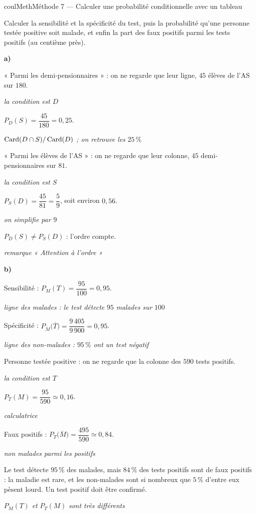 \documentclass[11pt,a4paper]{article}
\makeatletter
\renewcommand{\approx}{\simeq}
\newcounter{lycee@signet}
\newcommand{\signet}[3][]{\stepcounter{lycee@signet}%
  \edef\lycee@dest{\if\relax\detokenize{#1}\relax
    signet.\arabic{lycee@signet}\else#1\fi}%
  \hypertarget{\lycee@dest}{}\bookmark[level=#2,dest=\lycee@dest]{#3}}
\newcommand{\res}[1]{#1}
\newcounter{methode}
\newenvironment{methodebox}[1][Méthode]{\stepcounter{methode}%
  \begin{boitecours}[phantom={\signet[methode-\arabic{methode}]{2}{#1}}]{coulMeth}{#1}}%
  {\end{boitecours}}
\newcommand{\explique}[2]{\par\smallskip\noindent
  \begin{minipage}[t]{0.57\linewidth}\raggedright #1\end{minipage}\hfill
  \begin{minipage}[t]{0.40\linewidth}\raggedright\leavevmode
    {\small\itshape\color{black!60}#2}\end{minipage}\par}
\newcommand{\cas}[1]{\par\smallskip\noindent\textbf{\color{coulExo}#1}\vadjust{\nobreak}}
\newenvironment{correction}{\par}{\par}
\makeatother
\begin{document}
\begin{methodebox}[Méthode 7 --- Calculer une probabilité conditionnelle avec un tableau]
\begin{questions}[label=\alph*)]
    Calculer la sensibilité et la spécificité du test, puis la probabilité qu'une
    personne testée positive soit malade, et enfin la part des faux positifs parmi
    les tests positifs (au centième près).
\end{questions}
\begin{correction}
\cas{a)}
\explique{« Parmi les demi-pensionnaires » : on ne regarde que leur ligne, $45$ élèves
de l'AS sur $180$.}{la condition est $D$}
\explique{$P_D(S)=\dfrac{45}{180}=\res{0{,}25}$.}{$\operatorname{Card}(D\cap S)/\operatorname{Card}(D)$ ;
on retrouve les $25\,\%$}
\explique{« Parmi les élèves de l'AS » : on ne regarde que leur colonne, $45$
demi-pensionnaires sur $81$.}{la condition est $S$}
\explique{$P_S(D)=\dfrac{45}{81}=\res{\dfrac{5}{9}}$, soit environ $0{,}56$.}{on
simplifie par $9$}
\explique{$P_D(S)\ne P_S(D)$ : l'ordre compte.}{remarque « Attention à l'ordre »}
\cas{b)}
\explique{Sensibilité : $P_M(T)=\dfrac{95}{100}=\res{0{,}95}$.}{ligne des malades : le
test détecte $95$ malades sur $100$}
\explique{Spécificité :
$P_{\overline{M}}\big(\overline{T}\big)=\dfrac{9\,405}{9\,900}=\res{0{,}95}$.}{ligne des
non-malades : $95\,\%$ ont un test négatif}
\explique{Personne testée positive : on ne regarde que la colonne des $590$ tests
positifs.}{la condition est $T$}
\explique{$P_T(M)=\dfrac{95}{590}\approx\res{0{,}16}$.}{calculatrice}
\explique{Faux positifs : $P_T\big(\overline{M}\big)=\dfrac{495}{590}\approx\res{0{,}84}$.}{non
malades parmi les positifs}
\explique{Le test détecte $95\,\%$ des malades, mais $84\,\%$ des tests positifs sont
de faux positifs : la maladie est rare, et les non-malades sont si nombreux que
$5\,\%$ d'entre eux pèsent lourd. Un test positif doit être confirmé.}{$P_M(T)$ et
$P_T(M)$ sont très différents}
\end{correction}


\end{methodebox}
\end{document}
